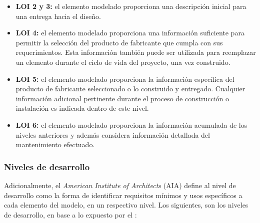 \begin{itemize}
    \item \textbf{LOI 2 y 3:} el elemento modelado proporciona una descripción inicial para una entrega hacia el diseño.
    \item \textbf{LOI 4:} el elemento modelado proporciona una información suficiente para permitir la selección del producto de fabricante que cumpla con sus requerimientos. Esta información también puede ser utilizada para reemplazar un elemento durante el ciclo de vida del proyecto, una vez construido.
    \item \textbf{LOI 5:} el elemento modelado proporciona la información específica del producto de fabricante seleccionado o lo construido y entregado. Cualquier información adicional pertinente durante el proceso de construcción o instalación es indicada dentro de este nivel.
    \item \textbf{LOI 6:} el elemento modelado proporciona la información acumulada de los niveles anteriores y además considera información detallada del mantenimiento efectuado.
\end{itemize}

\subsubsection{Niveles de desarrollo}

Adicionalmente, el \textit{American Institute of Architects} (AIA) define al nivel de desarrollo como la forma de identificar requisitos mínimos y usos específicos a cada elemento del modelo, en un respectivo nivel. Los siguientes, son los niveles de desarrollo, en base a lo expuesto por el :

